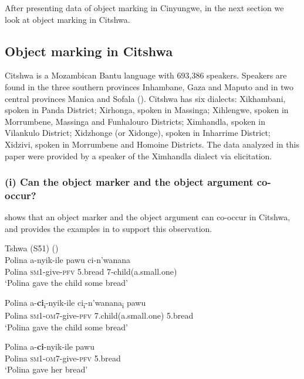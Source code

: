 \documentclass[output=paper]{langscibook}
\begin{document}
After presenting data of object marking in Cinyungwe, in the next section we look at object marking in Citshwa. 

\subsection{Object marking in Citshwa}\label{sec:ngunga:3.2}

Citshwa is a Mozambican Bantu language with 693,386 speakers. Speakers are found in the three southern provinces Inhambane, Gaza and Maputo and in two central provinces Manica and Sofala (\citealt{NgungaFaquir2011}). Citshwa has six dialects: Xikhambani, spoken in Panda District; Xirhonga, spoken in Massinga; Xihlengwe, spoken in Morrumbene, Massinga and Funhalouro Districts; Ximhandla, spoken in Vilankulo District; Xidzhonge (or Xidonge), spoken in Inharrime District; Xidzivi, spoken in Morrumbene and Homoine Districts. The data analyzed in this paper were provided by a speaker of the Ximhandla dialect via elicitation. 

\subsubsection{(i) Can the object marker and the object argument co-occur?}


\citet{Ngunga2014} shows that an object marker and the object argument can co-occur in Citshwa, and provides the examples in  to support this observation.

\ea\label{ex:ngunga:31}  Tshwa (S51) (\citealt[187]{Ngunga2014})\\
     \ea\label{ex:ngunga:31a} \gll  Polina    a-nyik-ile    pawu    ci-n’wanana\\
  Polina    {\textsc{sm1}}{}-give-{\textsc{pfv}} {5}.bread    {7}{}-child(a.small.one)\\
    \glt ‘Polina gave the child some bread’

    \ex\label{ex:ngunga:31b} \gll Polina    a-\textbf{ci}\textsubscript{i}{}-nyik-ile    ci\textsubscript{i}{}-n’wanana\textsubscript{i}    pawu\\
  Polina    {\textsc{sm1}}{}-{\textsc{om}7}{}-give-\textsc{pfv}     7.child(a.small.one)   {\textsc{}5}.bread\\
    \glt ‘Polina gave the child some bread’

    \ex\label{ex:ngunga:31c} \gll  Polina    a-\textbf{ci}{}-nyik-ile    pawu\\
  Polina    {\textsc{sm1}-\textsc{om}7}{}-give-\textsc{pfv}  5.bread  \\
\glt ‘Polina gave her bread’
\end{document}
